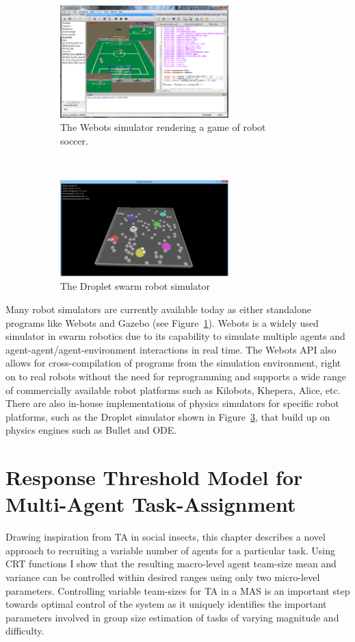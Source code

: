 \documentclass[defaultstyle,12pt]{proposal}
\begin{document}
\begin{figure}[!ht]
\begin{subfigure}{.5\textwidth}
\centering\includegraphics[width=6.5cm]{../assets/Webots.png}
\centering\caption{The Webots simulator rendering a game of robot soccer.}\label{fig:gazebo}
\end{subfigure}~
\begin{subfigure}{.5\textwidth}
\centering\includegraphics[width=6.5cm]{../assets/dsim.png}
\centering\caption{The Droplet swarm robot simulator}\label{fig:dropletsim}
\end{subfigure}
\caption{}
\end{figure}

Many robot simulators are currently available today as either standalone programs like Webots and Gazebo (see Figure~\ref{fig:gazebo}). Webots is a widely used simulator in swarm robotics due to its capability to simulate multiple agents and agent-agent/agent-environment interactions in real time. The Webots API also allows for cross-compilation of programs from the simulation environment, right on to real robots without the need for reprogramming and supports a wide range of commercially available robot platforms such as Kilobots, Khepera, Alice, etc. There are also in-house implementations of physics simulators for specific robot platforms, such as the Droplet simulator shown in Figure~\ref{fig:dropletsim}, that build up on physics engines such as Bullet and ODE.




\chapter{Response Threshold Model for Multi-Agent Task-Assignment}\label{ch:resthmodel}
Drawing inspiration from TA in social insects, this chapter describes a novel approach to recruiting a variable number of agents for a particular task. Using CRT functions I show that the resulting macro-level agent team-size mean and variance can be controlled within desired ranges using only two micro-level parameters. Controlling variable team-sizes for TA in a MAS is an important step towards optimal control of the system as it uniquely identifies the important parameters involved in group size estimation of tasks of varying magnitude and difficulty. 
\end{document}
